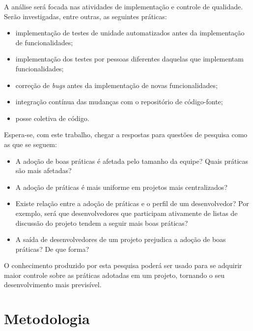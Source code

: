 \documentclass{article}
\begin{document}
A análise será focada nas atividades de implementação e controle de qualidade.
Serão investigadas, entre outras, as seguintes práticas:
\begin{itemize}
  \item implementação de testes de unidade automatizados antes da implementação
  de funcionalidades;
  \item implementação dos testes por pessoas diferentes daquelas que
  implementam funcionalidades;
  \item correção de \emph{bugs} antes da implementação de novas funcionalidades;
  \item integração contínua das mudanças com o repositório de código-fonte;
  \item posse coletiva de código.
\end{itemize}

Espera-se, com este trabalho, chegar a respostas para questões de pesquisa
como as que se seguem:

\begin{itemize}
  \item A adoção de boas práticas é afetada pelo tamanho da equipe? Quais
práticas são mais afetadas?
  \item A adoção de práticas é mais uniforme em projetos mais centralizados?
  \item Existe relação entre a adoção de práticas e o perfil de um
desenvolvedor? Por exemplo, será que desenvolvedores que participam ativamente
de listas de discussão do projeto tendem a seguir mais boas práticas?
  \item A saída de desenvolvedores de um projeto prejudica a adoção de boas
práticas? De que forma?
\end{itemize}

O conhecimento produzido por esta pesquisa poderá ser usado para se adquirir
maior controle sobre as práticas adotadas em um projeto, tornando o seu
desenvolvimento mais previsível.


\section{Metodologia}
\end{document}
